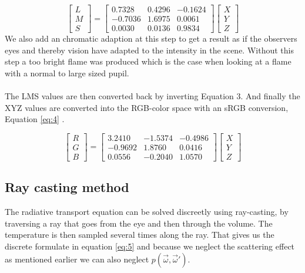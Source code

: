 \begin{equation}
\label{eq:3}
	\begin{bmatrix}
       L          \\
       M \\
       S
     \end{bmatrix} =
 	\begin{bmatrix}
       0.7328 & 0.4296 & -0.1624 \\
     -0.7036 & 1.6975 &  0.0061 \\
0.0030 & 0.0136 & 0.9834
     \end{bmatrix}
\begin{bmatrix}
      X          \\
       Y \\
       Z
     \end{bmatrix}
\end{equation}
We also add an chromatic adaption at this step to get a result as if the observers eyes and thereby vision have adapted to the intensity in the scene. Without this step a too bright flame was produced which is the case when looking at a flame with a normal to large sized pupil. \\\\
The LMS values are then converted back by inverting Equation 3. And finally the XYZ values are converted into the RGB-color space with an sRGB conversion, Equation \ref{eq:4} \cite{sRGB}.

\begin{equation}
\label{eq:4}
	\begin{bmatrix}
      R          \\
       G \\
       B
     \end{bmatrix} =
 	\begin{bmatrix}
      3.2410	& -1.5374	&  -0.4986 \\
	 -0.9692 & 1.8760	&  0.0416 \\
	 0.0556 & -0.2040	& 1.0570
     \end{bmatrix}
\begin{bmatrix}
      X          \\
       Y \\
       Z
     \end{bmatrix}
\end{equation}

\subsection{Ray casting method}
The radiative transport equation can be solved discreetly using ray-casting, by traversing a ray that goes from the eye and then through the volume. The temperature is then sampled several times along the ray. That gives us the discrete formulate in equation \ref{eq:5} \cite{Nguyen02} and because we neglect the scattering effect as mentioned earlier we can also neglect $ p(\vec{\omega},\vec{\omega}')$.

